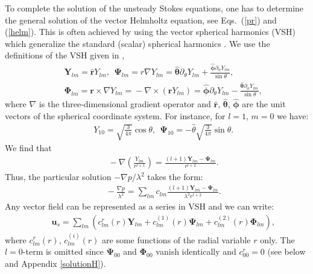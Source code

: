 \documentclass[aps,prx,twocolumn,amsmath,amssymb,amsfonts]{revtex4-2}
\begin{document}
To complete the solution of the unsteady Stokes equations, one has to determine the general solution of the vector Helmholtz equation, see Eqs.~(\ref{pr}) and (\ref{helm}). This is often achieved by using the vector spherical harmonics (VSH) which generalize the standard (scalar) spherical harmonics \cite{abs,St,mors}. We use the definitions of the VSH given in \cite{sph},
\begin{eqnarray}&&\!\!\!\!\!\!
\bm Y_{lm}=\bm{\hat r}Y_{lm},\ \ \bm \Psi_{lm}=r\nabla Y_{lm}=\bm{\hat \theta}
\partial_{\theta}Y_{lm}+\frac{\bm{\hat \phi}\partial_{\phi}Y_{lm}}{\sin\theta},\nonumber\\&&\!\!\!\!\!\!
\bm \Phi_{lm}\!=\!\bm r\!\times \!\nabla Y_{lm}\!=\!-\nabla\!\times\! (\bm r Y_{lm})\!=\!\bm{\hat \phi}\partial_{\theta}Y_{lm}\!-\!\frac{\bm{\hat \theta}\partial_{\phi}Y_{lm}}{\sin\theta}, \label{vsh}
\end{eqnarray}
where $\nabla$ is the three-dimensional gradient operator and $\bm{\hat r}$, $\bm{\hat \theta}$, $\bm{\hat \phi}$ are the unit vectors of the spherical coordinate system. For instance, for $l\!=\!1$, $m\!=\!0$ we have:
\begin{eqnarray}&&\!\!\!\!\!\!\!\!\!\!\!\!
Y_{10}=\sqrt{\frac{3}{4\pi}}\cos\theta,\ \ \bm \Psi_{10}=-{\hat \theta}\sqrt{\frac{3}{4\pi}}\sin\theta. \label{definition}
\end{eqnarray}
We find that
\begin{eqnarray}&&\!\!\!\!\!\!\!\!\!\!\!\!\!\!\!\!\!
-\nabla \left(\frac{Y_{lm}}{r^{l+1}}\right)\!=\!\frac{(l+1)\bm Y_{lm}\!-\!\bm \Psi_{lm}}{r^{l+2}}. \label{slo}
\end{eqnarray}
Thus, the particular solution $-\nabla p/\lambda^{2}$ takes the form:
\begin{eqnarray}&&\!\!\!\!\!\!\!\!\!\!\!\!\!\!\!\!\!
-\frac{\nabla p}{\lambda^2}
\!=\!\sum_{lm} c_{lm}\frac{(l+1)\bm Y_{lm}-\bm \Psi_{lm}}{\lambda^2 r^{l+2}}. \label{ps}
\end{eqnarray}
Any vector field can be represented as a series in VSH \cite{sph} and we can write:
\begin{eqnarray}&&\!\!\!\!\!\!\!\!\!\!
\bm u_s\!=\!\sum_{lm}\! \left(c^r_{lm}(r)\bm Y_{lm}\!+\!c^{(1)}_{lm}(r)\bm \Psi_{lm}\!+\!c^{(2)}_{lm}(r)\bm \Phi_{lm}\right),\label{expansion1}
\end{eqnarray}
where $c^r_{lm}(r)$, $c^{(i)}_{lm}(r)$ are some functions of the radial variable $r$ only.  The $l=0$-term is omitted since $\bm \Psi_{00}$ and $\bm \Phi_{00}$ vanish identically and $c^r_{00}=0$ (see below and Appendix \ref{solutionH}).
\end{document}
